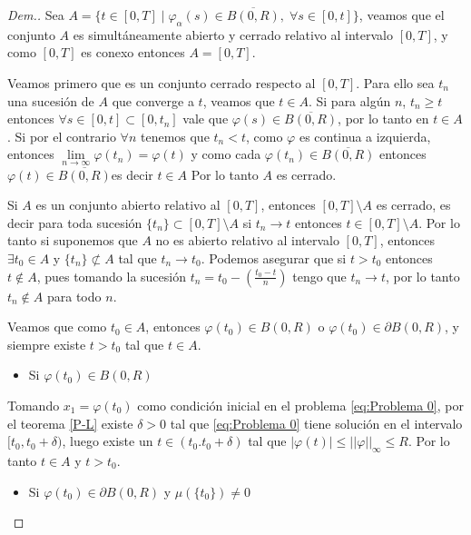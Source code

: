  \begin{proof}[Dem.]
 	Sea $A=\{t\in [0,T] \mid \varphi_\alpha(s)\in \overline{B(0,R)}, \; \forall s\in [0,t]\}$, veamos que el conjunto $A$ es simultáneamente abierto y cerrado relativo al intervalo $[0,T]$, y  como $[0,T]$ es conexo entonces $A=[0,T]$.
 	
 	Veamos primero que es un conjunto cerrado respecto al $[0,T]$. Para ello sea   $t_n$  una sucesión de $A$ que converge a $t$, veamos que $t\in A$.  Si para algún $n$, $t_n\geq t$ entonces $\forall s \in [0,t]\subset [0,t_n] $ vale que $\varphi(s)\in\overline{B(0,R)}$,  por lo tanto en $t\in A$.  Si por el contrario $\forall n$ tenemos que $t_n < t$,  como $\varphi$ es continua a izquierda, entonces $\lim\limits_{n\to \infty}\varphi(t_n)=\varphi(t)$ y como cada $\varphi(t_n)\in \overline{B(0,R)}$ entonces $\varphi(t)\in \overline{B(0,R)}$es decir $t\in A$ Por lo tanto $A$ es cerrado.
 	 
  	Si $A$ es un conjunto abierto relativo al $[0,T]$, entonces $[0,T]\setminus A$ es cerrado, es decir para toda sucesión $\{t_n\}\subset [0,T]\setminus A$ si $t_n\to t$ entonces $t\in[0,T]\setminus A$. Por lo tanto si suponemos que  $A$ no es abierto relativo al intervalo $[0,T]$, entonces $\exists t_0\in A$ y $\{t_n\}\nsubset A$ tal que $t_n\to t_0$. Podemos asegurar que si $t> t_0$ entonces $t\notin A$, pues tomando la sucesión $t_n=t_0-\left(\frac{t_0-t}{n}\right)$ tengo que $t_n\to t$, por lo tanto $t_n\notin A$ para todo $n$.
   
   Veamos que como $t_0\in A$, entonces $\varphi(t_0)\in B(0,R)$ o  $\varphi(t_0)\in \partial B(0,R) $, y siempre existe $t> t_0$ tal que $t\in A$.%
 		\begin{itemize}
   		\item Si $\varphi(t_0)\in B(0,R)$
     \end{itemize}
    Tomando $x_1=\varphi(t_0)$ como condición inicial en el problema \ref{eq:Problema 0}, por el teorema \ref{P-L}  existe $\delta>0$ tal que \eqref{eq:Problema 0} tiene solución en el intervalo $[t_0,t_0+\delta)$, luego existe un $t\in(t_0.t_0+\delta)$ tal que $|\varphi(t)|\leq||\varphi||_\infty\leq R$. Por lo tanto $t\in A$ y $t>t_0$.
    
    \begin{itemize}
        
    
    \item Si $\varphi(t_0)\in \partial B(0,R)$ y $\mu(\{t_0\})\neq 0$
    

\end{itemize}
\end{proof}

